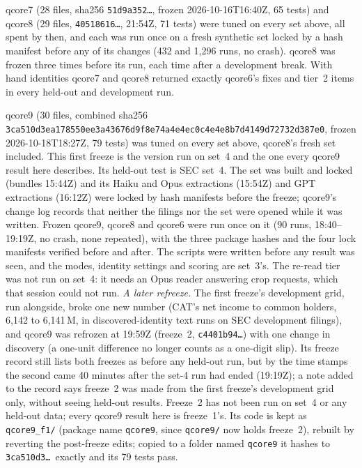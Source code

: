 \documentclass[10pt,twocolumn]{article}
\newcommand{\vq}[1]{\textsf{qcore#1}}
\newcommand{\code}[1]{\texttt{\small #1}}
\begin{document}
\vq{7} (28 files, sha256 \code{51d9a352\dots}, frozen 2026-10-16T16:40Z, 65 tests) and \vq{8} (29 files, \code{40518616\dots}, 21:54Z, 71 tests) were tuned on every set above, all spent by then, and each was run once on a fresh synthetic set locked by a hash manifest before any of its changes (432 and 1,296 runs, no crash). \vq{8} was frozen three times before its run, each time after a development break. With hand identities \vq{7} and \vq{8} returned exactly \vq{6}'s fixes and tier~2 items in every held-out and development run.

\vq{9} (30 files, combined sha256 {\small\nolinkurl{3ca510d3ea178550ee3a43676d9f8e74a4e4ec0c4e4e8b7d4149d72732d387e0}}, frozen 2026-10-18T18:27Z, 79 tests) was tuned on every set above, \vq{8}'s fresh set included. This first freeze is the version run on set~4 and the one every \vq{9} result here describes. Its held-out test is SEC set~4. The set was built and locked (bundles 15:44Z) and its Haiku and Opus extractions (15:54Z) and GPT extractions (16:12Z) were locked by hash manifests before the freeze; \vq{9}'s change log records that neither the filings nor the set were opened while it was written. Frozen \vq{9}, \vq{8} and \vq{6} were run once on it (90 runs, 18:40--19:19Z, no crash, none repeated), with the three package hashes and the four lock manifests verified before and after. The scripts were written before any result was seen, and the modes, identity settings and scoring are set~3's. The re-read tier was not run on set~4: it needs an Opus reader answering crop requests, which that session could not run. \emph{A later refreeze.} The first freeze's development grid, run alongside, broke one new number (CAT's net income to common holders, 6,142 to 6,141\,M, in discovered-identity text runs on SEC development filings), and \vq{9} was refrozen at 19:59Z (freeze~2, \code{c4401b94\dots}) with one change in discovery (a one-unit difference no longer counts as a one-digit slip). Its freeze record still lists both freezes as before any held-out run, but by the time stamps the second came 40 minutes after the set-4 run had ended (19:19Z); a note added to the record says freeze~2 was made from the first freeze's development grid only, without seeing held-out results. Freeze~2 has not been run on set~4 or any held-out data; every \vq{9} result here is freeze~1's. Its code is kept as \code{qcore9\_f1/} (package name \code{qcore9}, since \code{qcore9/} now holds freeze~2), rebuilt by reverting the post-freeze edits; copied to a folder named \code{qcore9} it hashes to \code{3ca510d3\dots}\ exactly and its 79 tests pass.
\end{document}
